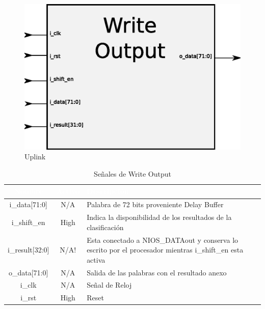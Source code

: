 \begin{figure}[H]
  \centering
	\includegraphics[scale=0.55]{3-arquitectura/graf/bloqwrite.eps}
  \caption{Uplink}
  \label{fig:bloquplink}
\end{figure}
	

\begin{table}
	\begin{tabular}{|c|c|p{9cm}|} \hline
\rowcolor[gray]{0.1} \textcolor{white}{Nombre} & \textcolor{white}{Activo} & \textcolor{white}{Descripción}\\ \hline
\rowcolor[gray]{0.75} i\_data[71:0]	& N/A & Palabra de 72 bits proveniente Delay Buffer\\ \hline
\rowcolor[gray]{0.75} i\_shift\_en & High & Indica la disponibilidad de los resultados de la clasificación\\ \hline
\rowcolor[gray]{0.75} i\_result[32:0] & N/A! & Esta conectado a NIOS\_DATAout y conserva lo escrito por el procesador mientras i\_shift\_en esta activa \\ \hline
\rowcolor[gray]{0.9} o\_data[71:0] & N/A & Salida de las palabras con el resultado anexo\\ \hline
 i\_clk & N/A & Señal de Reloj\\ \hline
 i\_rst & High & Reset\\ \hline
	\end{tabular}
	\caption{Señales de Write Output}
	\label{tab:sigwo}
\end{table}




